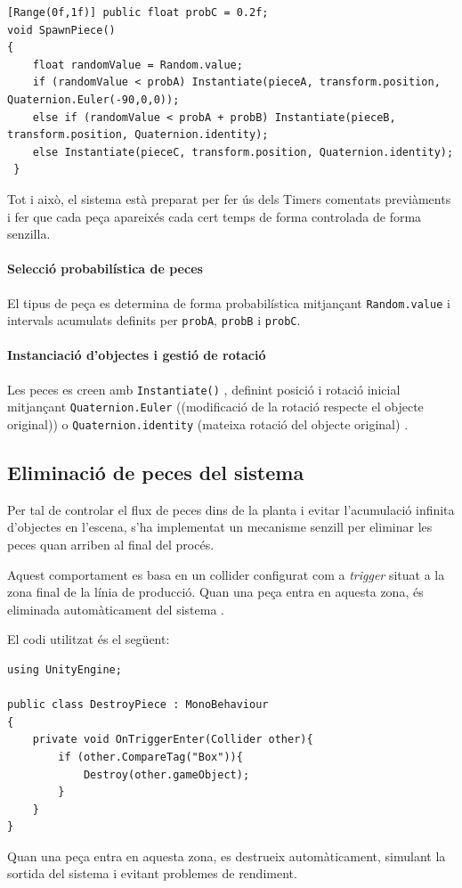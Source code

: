 \documentclass[12pt,a4paper]{report}
\begin{document}
\begin{lstlisting}[language=CSharp, caption=Script de generació de peces, label=lst:spawner]
[Range(0f,1f)] public float probC = 0.2f;
void SpawnPiece()
{
    float randomValue = Random.value;
    if (randomValue < probA) Instantiate(pieceA, transform.position, Quaternion.Euler(-90,0,0));
    else if (randomValue < probA + probB) Instantiate(pieceB, transform.position, Quaternion.identity);
    else Instantiate(pieceC, transform.position, Quaternion.identity);
 }
\end{lstlisting}


Tot i això, el sistema està preparat per fer ús dels Timers comentats previàments i fer que cada peça apareixés cada cert temps de forma controlada de forma senzilla. 


\paragraph{Selecció probabilística de peces}
El tipus de peça es determina de forma probabilística mitjançant \texttt{Random.value} i intervals acumulats definits per \texttt{probA}, \texttt{probB} i \texttt{probC}.


\paragraph{Instanciació d'objectes i gestió de rotació}

Les peces es creen amb \texttt{Instantiate()} \cite{UnityInstantiate}, definint posició i rotació inicial mitjançant \texttt{Quaternion.Euler} ((modificació de la rotació respecte el objecte original)) o \texttt{Quaternion.identity} (mateixa rotació del objecte original) \cite{UnityQuaternion}.


\subsection{Eliminació de peces del sistema}

Per tal de controlar el flux de peces dins de la planta i evitar l'acumulació infinita d'objectes en l'escena, s'ha implementat un mecanisme senzill per eliminar les peces quan arriben al final del procés.

Aquest comportament es basa en un collider configurat com a \textit{trigger} situat a la zona final de la línia de producció. Quan una peça entra en aquesta zona, és eliminada automàticament del sistema \cite{UnityLearnDestroyI}.

El codi utilitzat és el següent:

\begin{lstlisting}[language=CSharp]
using UnityEngine;

public class DestroyPiece : MonoBehaviour
{
    private void OnTriggerEnter(Collider other){
        if (other.CompareTag("Box")){
            Destroy(other.gameObject);
        }
    }
}
\end{lstlisting}

Quan una peça entra en aquesta zona, es destrueix automàticament, simulant la sortida del sistema i evitant problemes de rendiment.
\end{document}
